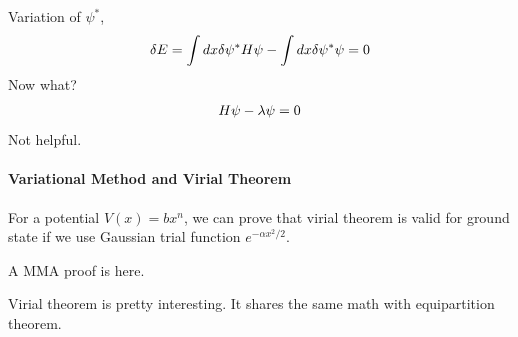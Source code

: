 \documentclass[letterpaper,10pt,english]{sphinxmanual}
\begin{document}
Variation of \(\psi^*\),
\begin{gather}
\begin{split}\delta E = \int dx \delta \psi^* H \psi - \int dx \delta \psi^* \psi = 0\end{split}\notag
\end{gather}
Now what?
\begin{gather}
\begin{split}H \psi - \lambda \psi = 0\end{split}\notag
\end{gather}
Not helpful.


\paragraph{Variational Method and Virial Theorem}
\label{Quantum/approx:variational-method-and-virial-theorem}
For a potential \(V(x)=b x^n\), we can prove that virial theorem is valid for ground state if we use Gaussian trial function \(e^{- \alpha x^2/2}\).

A MMA proof is here.

Virial theorem is pretty interesting. It shares the same math with equipartition theorem.
\end{document}
